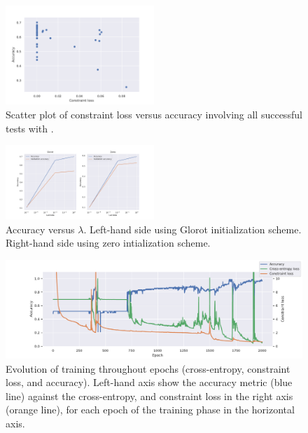 \begin{figure}[h]
  \centering  
	\includegraphics[width=0.5\textwidth]{constraint_loss}
      \caption{Scatter plot of constraint loss versus accuracy involving all successful tests with \cifar.}
\label{fig:constraintLoss}
\end{figure}

\begin{figure}[h]
\centering    
\includegraphics[width=0.5\textwidth]{lambdas}
      \caption{Accuracy versus $\lambda$. Left-hand side using Glorot initialization scheme. Right-hand side using zero intialization scheme.}
\label{fig:lambdas}
\end{figure}

\begin{figure}[h]
  \begin{center}
    \includegraphics[width=1.0\textwidth]{peaks}
      \caption{Evolution of training throughout epochs (cross-entropy, constraint loss, and accuracy). Left-hand axis show the accuracy metric (blue line) against the cross-entropy, and constraint loss in the right axis (orange line), for each epoch of the training phase in the horizontal axis.}
			\label{fig:peaks}
\end{center}
\end{figure}

